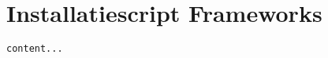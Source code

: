 \section{Installatiescript Frameworks}
\label{sec:installatie-frameworks}
\begin{lstlisting}[language=python]
content...
\end{lstlisting}